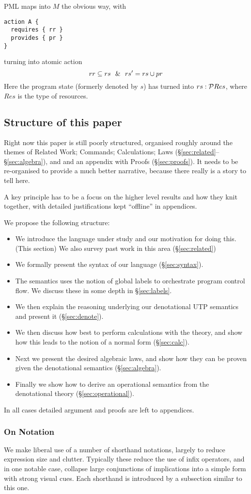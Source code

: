 PML maps into $M$ the obvious way,
with
\begin{verbatim}
action A {
  requires { rr }
  provides { pr }
}
\end{verbatim}
turning into atomic action
\[
rr \subseteq rs ~~\&~~ rs' = rs \cup pr
\]
Here the program state (formerly denoted by $s$)
has turned into $rs:\mathcal{P} Res$, where $Res$ is the type of resources.


\subsection{Structure of this paper}

Right now this paper is still poorly structured,
organised roughly around the themes of
Related Work;
Commands;
Calculations;
Laws (\S\ref{sec:related}--\S\ref{sec:algebra}),
and and an appendix with Proofs (\S\ref{sec:proofs}).
It needs to be re-organised to provide a much better narrative,
because there really is a story to tell here.

A key principle has to be a focus on the higher level results and how
they knit together,
with detailed justifications kept ``offline'' in appendices.

We propose the following structure:
\begin{itemize}
  \item
     We introduce the language under study and our motivation for doing this.
     (This section)
     We also survey past work in this area (\S\ref{sec:related})
  \item
    We formally present the syntax of our language (\S\ref{sec:syntax}).
  \item
     The semantics uses the notion of global labels to orchestrate
     program control flow. We discuss these in some depth in \S\ref{sec:labels}.
  \item
     We then explain the reasoning underlying our denotational
     UTP semantics and present it (\S\ref{sec:denote}).
  \item
     We then discuss how best to perform calculations with the theory,
     and show how this leads to the notion of a normal form
     (\S\ref{sec:calc}).
  \item
     Next we present the desired algebraic laws,
     and show how they can be proven given the denotational semantics
     (\S\ref{sec:algebra}).
  \item
     Finally we show how to derive an operational semantics from
     the denotational theory
     (\S\ref{sec:operational}).
\end{itemize}
In all cases detailed argument and proofs are left to appendices.

\subsubsection{On Notation}

We make liberal use of a number of shorthand notations,
largely to reduce expression size and clutter.
Typically these reduce the use of infix operators,
and in one notable case, collapse large conjunctions
of implications into a simple form with strong visual cues.
Each shorthand is introduced by a subsection similar to this one.
